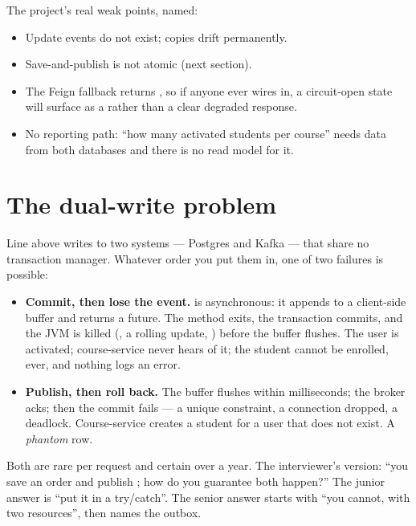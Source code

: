 The project's real weak points, named:

\begin{itemize}
  \item Update events do not exist; copies drift permanently.
  \item Save-and-publish is not atomic (next section).
  \item The Feign fallback returns , so if anyone ever wires
   in, a circuit-open state will surface as a
   rather than a clear degraded response.
  \item No reporting path: ``how many activated students per course''
  needs data from both databases and there is no read model for it.
\end{itemize}

\section{The dual-write problem}
\label{sec:dual-write}

Line  above writes to two systems --- Postgres and Kafka --- that
share no transaction manager. Whatever order you put them in, one of
two failures is possible:

\begin{itemize}
  \item \textbf{Commit, then lose the event.}  is
  asynchronous: it appends to a client-side buffer and returns a future.
  The method exits, the transaction commits, and the JVM is killed
  (, a rolling update, ) before
  the buffer flushes. The user is activated; course-service never hears
  of it; the student cannot be enrolled, ever, and nothing logs an
  error.
  \item \textbf{Publish, then roll back.} The buffer flushes within
  milliseconds; the broker acks; then the commit fails --- a unique
  constraint, a connection dropped, a deadlock. Course-service creates a
  student for a user that does not exist. A \emph{phantom} row.
\end{itemize}

Both are rare per request and certain over a year. The interviewer's
version: ``you save an order and publish ; how do you
guarantee both happen?'' The junior answer is ``put it in a
try/catch''. The senior answer starts with ``you cannot, with two
resources'', then names the outbox.

